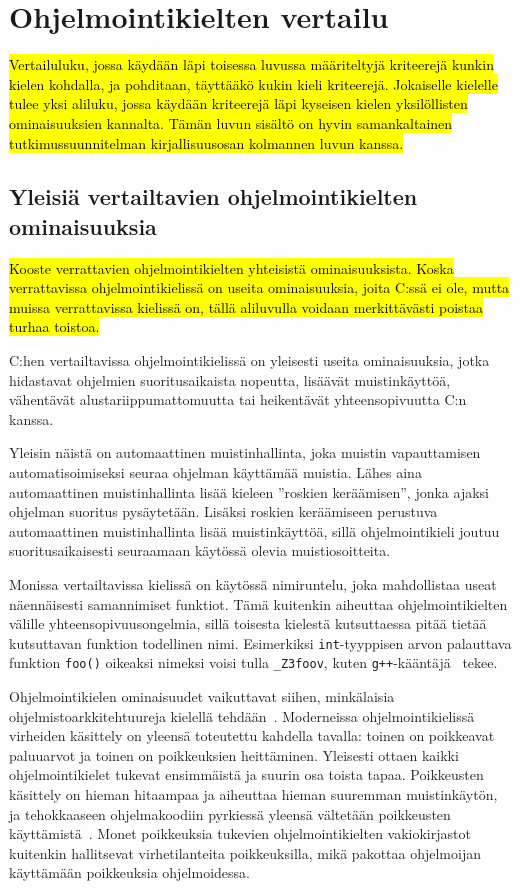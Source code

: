 \section{Ohjelmointikielten vertailu}
\label{sec:muut}

\hl{Vertailuluku, jossa käydään läpi toisessa luvussa määriteltyjä kriteerejä
kunkin kielen kohdalla, ja pohditaan, täyttääkö kukin kieli kriteerejä.
Jokaiselle kielelle tulee yksi aliluku, jossa käydään kriteerejä läpi kyseisen
kielen yksilöllisten ominaisuuksien kannalta. Tämän luvun sisältö on hyvin
samankaltainen tutkimussuunnitelman kirjallisuusosan kolmannen luvun kanssa.}

\subsection{Yleisiä vertailtavien ohjelmointikielten ominaisuuksia}
\label{sec:muut:common}

\hl{Kooste verrattavien ohjelmointikielten yhteisistä ominaisuuksista. Koska
verrattavissa ohjelmointikielissä on useita ominaisuuksia, joita C:ssä ei ole,
mutta muissa verrattavissa kielissä on, tällä aliluvulla voidaan merkittävästi
poistaa turhaa toistoa.}

C:hen vertailtavissa ohjelmointikielissä on yleisesti useita ominaisuuksia,
jotka hidastavat ohjelmien suoritusaikaista nopeutta, lisäävät muistinkäyttöä,
vähentävät alustariippumattomuutta tai heikentävät yhteensopivuutta C:n kanssa.

Yleisin näistä on automaattinen muistinhallinta, joka muistin vapauttamisen
automatisoimiseksi seuraa ohjelman käyttämää muistia. Lähes aina automaattinen
muistinhallinta lisää kieleen ''roskien keräämisen'', jonka ajaksi ohjelman suoritus pysäytetään. Lisäksi roskien
keräämiseen perustuva automaattinen muistinhallinta lisää muistinkäyttöä, sillä
ohjelmointikieli joutuu suoritusaikaisesti seuraamaan käytössä olevia
muistiosoitteita.

Monissa vertailtavissa kielissä on käytössä nimiruntelu,
joka mahdollistaa useat näennäisesti samannimiset funktiot. Tämä kuitenkin
aiheuttaa ohjelmointikielten välille yhteensopivuusongelmia, sillä toisesta
kielestä kutsuttaessa pitää tietää kutsuttavan funktion todellinen nimi.
Esimerkiksi \texttt{int}-tyyppisen arvon palauttava funktion \texttt{foo()}
oikeaksi nimeksi voisi tulla \texttt{\_Z3foov}, kuten
\texttt{g++}-kääntäjä~\citep{gcc} tekee.

Ohjelmointikielen ominaisuudet vaikuttavat siihen, minkälaisia
ohjelmistoarkkitehtuureja kielellä tehdään~\citep{designpatternsdesign}.
Moderneissa ohjelmointikielissä virheiden käsittely on yleensä toteutettu
kahdella tavalla: toinen on poikkeavat paluuarvot ja toinen on poikkeuksien
heittäminen. Yleisesti ottaen kaikki ohjelmointikielet tukevat ensimmäistä ja
suurin osa toista tapaa. Poikkeusten käsittely on hieman hitaampaa ja aiheuttaa
hieman suuremman muistinkäytön, ja tehokkaaseen ohjelmakoodiin pyrkiessä
yleensä vältetään poikkeusten käyttämistä~\citep{exceptioncosts}. Monet
poikkeuksia tukevien ohjelmointikielten vakiokirjastot kuitenkin hallitsevat
virhetilanteita poikkeuksilla, mikä pakottaa ohjelmoijan käyttämään poikkeuksia
ohjelmoidessa.


